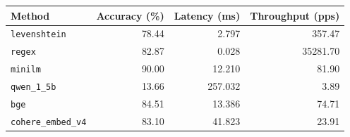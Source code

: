 \begin{table}[t]
\centering
\small
\begin{tabular}{lrrr}
\toprule
Method & Accuracy (\%) & Latency (ms) & Throughput (pps) \\
\midrule
\texttt{levenshtein} & 78.44 & 2.797 & 357.47 \\
\texttt{regex} & 82.87 & 0.028 & 35281.70 \\
\texttt{minilm} & 90.00 & 12.210 & 81.90 \\
\texttt{qwen_1_5b} & 13.66 & 257.032 & 3.89 \\
\texttt{bge} & 84.51 & 13.386 & 74.71 \\
\texttt{cohere_embed_v4} & 83.10 & 41.823 & 23.91 \\
\bottomrule
\end{tabular}
\end{table}
